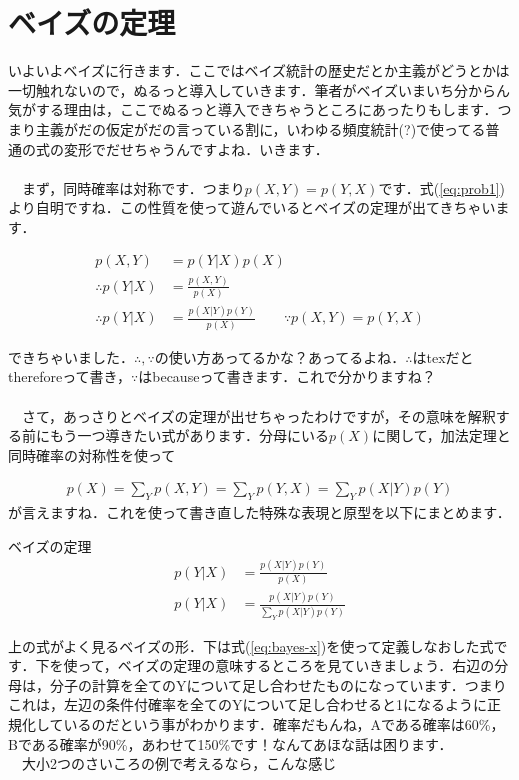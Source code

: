 \documentclass[11pt,a4paper]{ujreport} 	%
\begin{document}
\section{ベイズの定理}
いよいよベイズに行きます．ここではベイズ統計の歴史だとか主義がどうとかは一切触れないので，ぬるっと導入していきます．筆者がベイズいまいち分からん気がする理由は，ここでぬるっと導入できちゃうところにあったりもします．つまり主義がだの仮定がだの言っている割に，いわゆる頻度統計(?)で使ってる普通の式の変形でだせちゃうんですよね．いきます．\\
\\
　まず，同時確率は対称です．つまり$p(X,Y) = p(Y,X)$です．式(\ref{eq:prob1})より自明ですね．この性質を使って遊んでいるとベイズの定理が出てきちゃいます．

\begin{align}
\label{eq:bayes}
p(X, Y) &= p(Y|X)p(X)　\\
\therefore p(Y|X) &= \frac{p(X,Y)}{p(X)}  \\
\therefore p(Y|X) &= \frac{p(X|Y)p(Y)}{p(X)} \qquad \because p(X,Y) = p(Y, X)
\end{align}

できちゃいました．$\therefore, \because$の使い方あってるかな？あってるよね．$\therefore$はtexだとthereforeって書き，$\because$はbecauseって書きます．これで分かりますね？\\
\\
　さて，あっさりとベイズの定理が出せちゃったわけですが，その意味を解釈する前にもう一つ導きたい式があります．分母にいる$p(X)$に関して，加法定理と同時確率の対称性を使って

\begin{align}
\label{eq:bayes-x}
p(X) = \sum_Y p(X,Y) = \sum_Y p(Y,X) = \sum_Y p(X|Y)p(Y)
\end{align}
が言えますね．これを使って書き直した特殊な表現と原型を以下にまとめます．

\begin{screen}
ベイズの定理
\begin{align}
p(Y|X) &= \frac{p(X|Y)p(Y)}{p(X)}\\
p(Y|X) &= \frac{p(X|Y)p(Y)}{\sum_Y p(X|Y)p(Y)}
\end{align}
\end{screen}

上の式がよく見るベイズの形．下は式(\ref{eq:bayes-x})を使って定義しなおした式です．下を使って，ベイズの定理の意味するところを見ていきましょう．右辺の分母は，分子の計算を全てのYについて足し合わせたものになっています．つまりこれは，左辺の条件付確率を全てのYについて足し合わせると1になるように正規化しているのだという事がわかります．確率だもんね，Aである確率は60\%，Bである確率が90\%，あわせて150\%です！なんてあほな話は困ります．\\
　大小2つのさいころの例で考えるなら，こんな感じ
\end{document}
